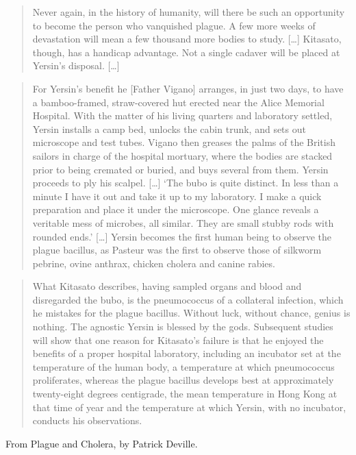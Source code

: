 \documentclass[
]{book}
\newenvironment{rnote}{\par\raggedleft}{\par}
\begin{document}
\begin{quote}
Never again, in the history of humanity, will there be such an opportunity to become the person who vanquished plague. A few more weeks of devastation will mean a few thousand more bodies to study. {[}\ldots{]} Kitasato, though, has a handicap advantage. Not a single cadaver will be placed at Yersin's disposal. {[}\ldots{]}
\end{quote}

\begin{quote}
For Yersin's benefit he {[}Father Vigano{]} arranges, in just two days, to have a bamboo-framed, straw-covered hut erected near the Alice Memorial Hospital. With the matter of his living quarters and laboratory settled, Yersin installs a camp bed, unlocks the cabin trunk, and sets out microscope and test tubes. Vigano then greases the palms of the British sailors in charge of the hospital mortuary, where the bodies are stacked prior to being cremated or buried, and buys several from them. Yersin proceeds to ply his scalpel. {[}\ldots{]} `The bubo is quite distinct. In less than a minute I have it out and take it up to my laboratory. I make a quick preparation and place it under the microscope. One glance reveals a veritable mess of microbes, all similar. They are small stubby rods with rounded ends.' {[}\ldots{]} Yersin becomes the first human being to observe the plague bacillus, as Pasteur was the first to observe those of silkworm pebrine, ovine anthrax, chicken cholera and canine rabies.
\end{quote}

\begin{quote}
What Kitasato describes, having sampled organs and blood and disregarded the bubo, is the pneumococcus of a collateral infection, which he mistakes for the plague bacillus. Without luck, without chance, genius is nothing. The agnostic Yersin is blessed by the gods. Subsequent studies will show that one reason for Kitasato's failure is that he enjoyed the benefits of a proper hospital laboratory, including an incubator set at the temperature of the human body, a temperature at which pneumococcus proliferates, whereas the plague bacillus develops best at approximately twenty-eight degrees centigrade, the mean temperature in Hong Kong at that time of year and the temperature at which Yersin, with no incubator, conducts his observations.
\end{quote}

\begin{rnote}
From Plague and Cholera, by Patrick Deville. \citep{deville2014plague}

\end{rnote}
\end{document}
